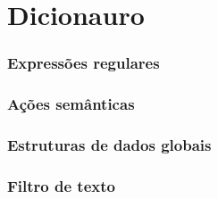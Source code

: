 \documentclass{article}
\begin{document}
\section{Dicionauro}

\subsubsection{Expressões regulares}

\subsubsection{Ações semânticas}

\subsubsection{Estruturas de dados globais}

\subsubsection{Filtro de texto}
\end{document}
